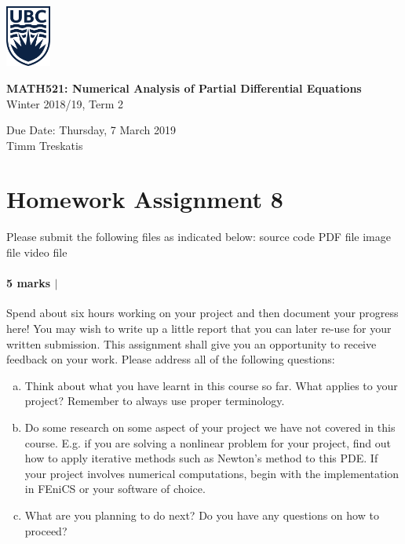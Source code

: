 \documentclass[10pt,letterpaper]{scrartcl}
\begin{document}
\begin{minipage}{.2\textwidth}
\includegraphics[width=42pt]{ubc-logo.png}
\end{minipage}
\hfill
\begin{minipage}{.75\textwidth}
\setlength{\parskip}{6pt}
\begin{flushright}
{
\sffamily
\textbf{MATH521: Numerical Analysis of Partial Differential Equations}\\
Winter 2018/19, Term 2

Due Date: Thursday, 7 March 2019\\
Timm Treskatis
}
\end{flushright}
\end{minipage}

\section*{Homework Assignment 8}

Please submit the following files as indicated below: \hfill \faFileCodeO \: source code \hfill \faFilePdfO \: PDF file \hfill \faFilePictureO \: image file \hfill \faFileMovieO \: video file

\paragraph*{5 marks $\vert$ \faFilePdfO}

Spend about six hours working on your project and then document your progress here! You may wish to write up a little report that you can later re-use for your written submission. This assignment shall give you an opportunity to receive feedback on your work. Please address all of the following questions:
\begin{enumerate}[(a)]
\item Think about what you have learnt in this course so far. What applies to your project? Remember to always use proper terminology.
\item Do some research on some aspect of your project we have not covered in this course. E.g. if you are solving a nonlinear problem for your project, find out how to apply iterative methods such as Newton's method to this PDE. If your project involves numerical computations, begin with the implementation in \textsf{FEniCS} or your software of choice.
\item What are you planning to do next? Do you have any questions on how to proceed?
\end{enumerate}
\end{document}
